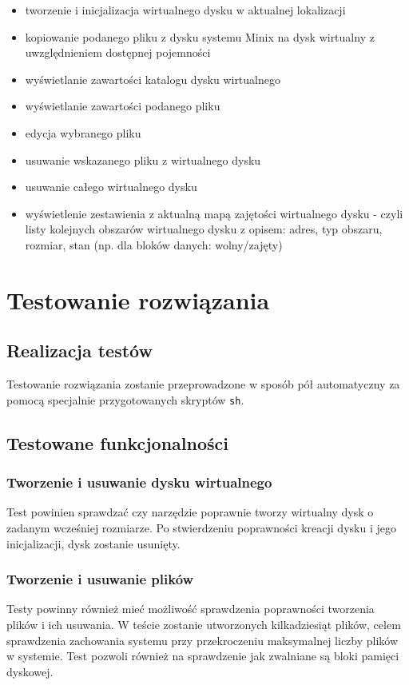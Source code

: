 \documentclass{mwrep}
\begin{document}
\begin{itemize}
    \item tworzenie i inicjalizacja wirtualnego dysku w aktualnej lokalizacji
    \item kopiowanie podanego pliku z dysku systemu Minix na dysk wirtualny z uwzględnieniem dostępnej pojemności 
    \item wyświetlanie zawartości katalogu dysku wirtualnego
    \item wyświetlanie zawartości podanego pliku
    \item edycja wybranego pliku 
    \item usuwanie wskazanego pliku z wirtualnego dysku
    \item usuwanie całego wirtualnego dysku
    \item wyświetlenie zestawienia z aktualną mapą zajętości wirtualnego dysku -
    czyli listy kolejnych obszarów wirtualnego dysku z opisem: adres, typ
    obszaru, rozmiar, stan (np. dla bloków danych: wolny/zajęty)
\end{itemize}

\chapter{Testowanie rozwiązania}
\section{Realizacja testów}
Testowanie rozwiązania zostanie przeprowadzone w sposób pół 
automatyczny za pomocą specjalnie przygotowanych skryptów \texttt{sh}. 

\section{Testowane funkcjonalności}

\subsection{Tworzenie i usuwanie dysku wirtualnego}
Test powinien sprawdzać czy narzędzie poprawnie tworzy wirtualny dysk o
zadanym wcześniej rozmiarze. Po stwierdzeniu poprawności kreacji dysku i jego 
inicjalizacji, dysk zostanie usunięty.

\subsection{Tworzenie i usuwanie plików}
Testy powinny również mieć możliwość sprawdzenia poprawności tworzenia plików i ich usuwania. W 
teście zostanie utworzonych kilkadziesiąt plików, celem sprawdzenia zachowania systemu przy przekroczeniu
maksymalnej liczby plików w systemie. Test pozwoli również na sprawdzenie jak zwalniane są bloki pamięci
dyskowej.
\end{document}
